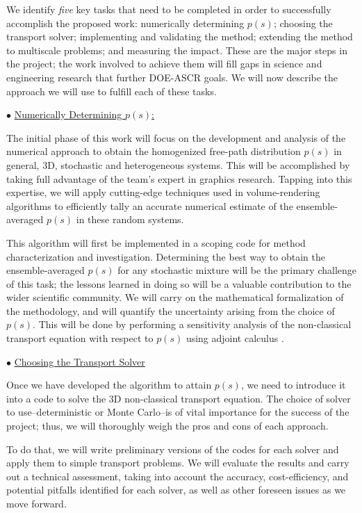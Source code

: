 \documentclass[12pt]{article}
\begin{document}
We identify \textit{five} key tasks that need to be completed in order to successfully accomplish the proposed work: numerically determining $p(s)$; choosing the transport solver; implementing and validating the method; extending the method to multiscale problems; and measuring the impact.
These are the major steps in the project; the work involved to achieve them will fill gaps in science and engineering research that further DOE-ASCR goals.
We will now describe the approach we will use to fulfill each of these tasks.

$\bullet$ \underline{Numerically Determining $p(s)$:}

The initial phase of this work will focus on the development and analysis of the numerical approach to obtain the homogenized free-path distribution $p(s)$ in general, 3D, stochastic and heterogeneous systems.
This will be accomplished by taking full advantage of the team's expert in graphics research.
Tapping into this expertise, we will apply cutting-edge techniques used in volume-rendering algorithms to efficiently tally an accurate numerical estimate of the ensemble-averaged $p(s)$ in these random systems.

This algorithm will first be implemented in a scoping code for method characterization and investigation.
Determining the best way to obtain the ensemble-averaged $p(s)$ for any stochastic mixture will be the primary challenge of this task; the lessons learned in doing so will be a valuable contribution to the wider scientific community.
We will carry on the mathematical formalization of the methodology, and will quantify the uncertainty arising from the choice of $p(s)$.
This will be done by performing a sensitivity analysis of the non-classical transport equation with respect to $p(s)$ using adjoint calculus \cite{barfra16,cac03}. 

$\bullet$ \underline{Choosing the Transport Solver}

Once we have developed the algorithm to attain $p(s)$, we need to introduce it into a code to solve the 3D non-classical transport equation.
The choice of solver to use--deterministic or Monte Carlo--is of vital importance for the success of the project; thus, we will thoroughly weigh the pros and cons of each approach.

To do that, we will write preliminary versions of the codes for each solver and apply them to simple transport problems.
We will evaluate the results and carry out a technical assessment, taking into account the accuracy, cost-efficiency, and potential pitfalls identified for each solver, as well as other foreseen issues as we move forward.
\end{document}
